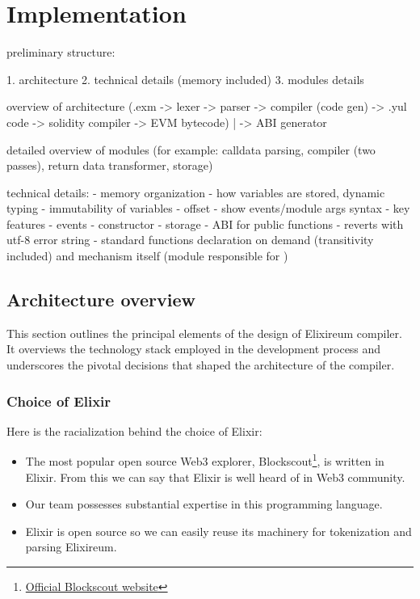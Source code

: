 \chapter{Implementation}
\label{chap:impl}


preliminary structure:

1. architecture
2. technical details (memory included)
3. modules details


overview of architecture (.exm -> lexer -> parser -> compiler (code gen) -> .yul code -> solidity compiler -> EVM bytecode)
                                                           |
                                                           -> ABI generator

detailed overview of modules (for example: calldata parsing, compiler (two passes), return data transformer, storage)


technical details:
  - memory organization
    - how variables are stored, dynamic typing
    - immutability of variables
    - offset
  - show events/module args syntax
  - key features
    - events
    - constructor
    - storage
    - ABI for public functions
    - reverts with utf-8 error string
  - standard functions declaration on demand (transitivity included) and mechanism itself (module responsible for )

\section{Architecture overview}
\label{sec:architecture}

This section outlines the principal elements of the design of Elixireum compiler. It overviews the technology stack employed in the development process and underscores the pivotal decisions that shaped the architecture of the compiler.


\subsection{Choice of Elixir}
Here is the racialization behind the choice of Elixir:
\begin{itemize}
    \item The most popular open source Web3 explorer, Blockscout\footnote{\href{https://www.blockscout.com/}{Official Blockscout website}}, is written in Elixir. From this we can say that Elixir is well heard of in Web3 community.
    \item Our team possesses substantial expertise in this programming language.
    \item Elixir is open source so we can easily reuse its machinery for tokenization and parsing Elixireum.
\end{itemize}

